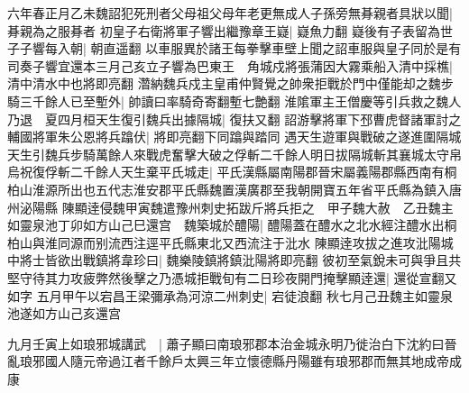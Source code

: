 六年春正月乙未魏詔犯死刑者父母祖父母年老更無成人子孫旁無朞親者具狀以聞|{
	朞親為之服朞者}
初皇子右衛將軍子響出繼豫章王嶷|{
	嶷魚力翻}
嶷後有子表留為世子子響每入朝|{
	朝直遥翻}
以車服異於諸王每拳擊車壁上聞之詔車服與皇子同於是有司奏子響宜還本三月己亥立子響為巴東王　角城戍將張蒲因大霧乘船入清中採樵|{
	清中清水中也將即亮翻}
濳納魏兵戍主皇甫仲賢覺之帥衆拒戰於門中僅能却之魏步騎三千餘人已至塹外|{
	帥讀曰率騎奇寄翻塹七艶翻}
淮隂軍主王僧慶等引兵救之魏人乃退　夏四月桓天生復引魏兵出據隔城|{
	復扶又翻}
詔游擊將軍下邳曹虎督諸軍討之輔國將軍朱公恩將兵蹹伏|{
	將即亮翻下同蹹與踏同}
遇天生遊軍與戰破之遂進圍隔城天生引魏兵步騎萬餘人來戰虎奮擊大破之俘斬二千餘人明日拔隔城斬其襄城太守帛烏祝復俘斬二千餘人天生棄平氏城走|{
	平氏漢縣屬南陽郡晉宋屬義陽郡縣西南有桐柏山淮源所出也五代志淮安郡平氏縣魏置漢廣郡至我朝開寶五年省平氏縣為鎮入唐州泌陽縣}
陳顯逹侵魏甲寅魏遣豫州刺史拓跋斤將兵拒之　甲子魏大赦　乙丑魏主如靈泉池丁卯如方山己巳還宫　魏築城於醴陽|{
	醴陽蓋在醴水之北水經注醴水出桐柏山與淮同源而别流西注逕平氏縣東北又西流注于沘水}
陳顯逹攻拔之進攻沘陽城中將士皆欲出戰鎮將韋珍曰|{
	魏樂陵鎮將鎮沘陽將即亮翻}
彼初至氣銳未可與爭且共堅守待其力攻疲弊然後擊之乃憑城拒戰旬有二日珍夜開門掩擊顯逹還|{
	還從宣翻又如字}
五月甲午以宕昌王梁彌承為河涼二州刺史|{
	宕徒浪翻}
秋七月己丑魏主如靈泉池遂如方山己亥還宫

九月壬寅上如琅邪城講武　|{
	蕭子顯曰南琅邪郡本治金城永明乃徙治白下沈約曰晉亂琅邪國人隨元帝過江者千餘戶太興三年立懷德縣丹陽雖有琅邪郡而無其地成帝成康}


